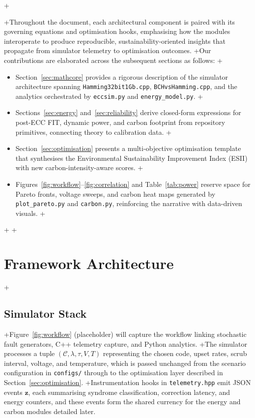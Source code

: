 +\documentclass[conference]{IEEEtran}
\begin{document}
+Throughout the document, each architectural component is paired with its governing equations and optimisation hooks, emphasising how the modules interoperate to produce reproducible, sustainability-oriented insights that propagate from simulator telemetry to optimisation outcomes.
+Our contributions are elaborated across the subsequent sections as follows:
+\begin{itemize}
+    \item Section~\ref{sec:mathcore} provides a rigorous description of the simulator architecture spanning \texttt{Hamming32bit1Gb.cpp}, \texttt{BCHvsHamming.cpp}, and the analytics orchestrated by \texttt{eccsim.py} and \texttt{energy\_model.py}.
+    \item Sections~\ref{sec:energy} and~\ref{sec:reliability} derive closed-form expressions for post-ECC FIT, dynamic power, and carbon footprint from repository primitives, connecting theory to calibration data.
+    \item Section~\ref{sec:optimisation} presents a multi-objective optimisation template that synthesises the Environmental Sustainability Improvement Index (ESII) with new carbon-intensity-aware scores.
+    \item Figures~\ref{fig:workflow}--\ref{fig:correlation} and Table~\ref{tab:power} reserve space for Pareto fronts, voltage sweeps, and carbon heat maps generated by \texttt{plot\_pareto.py} and \texttt{carbon.py}, reinforcing the narrative with data-driven visuals.
+\end{itemize}
+
+\section{Framework Architecture}
+\subsection{Simulator Stack}
+Figure~\ref{fig:workflow} (placeholder) will capture the workflow linking stochastic fault generators, C++ telemetry capture, and Python analytics.
+The simulator processes a tuple $(\mathcal{C}, \lambda, \tau, V, T)$ representing the chosen code, upset rates, scrub interval, voltage, and temperature, which is passed unchanged from the scenario configuration in \texttt{configs/} through to the optimisation layer described in Section~\ref{sec:optimisation}.
+Instrumentation hooks in \texttt{telemetry.hpp} emit JSON events $\mathbf{z}$, each summarising syndrome classification, correction latency, and energy counters, and these events form the shared currency for the energy and carbon modules detailed later.
\end{document}
